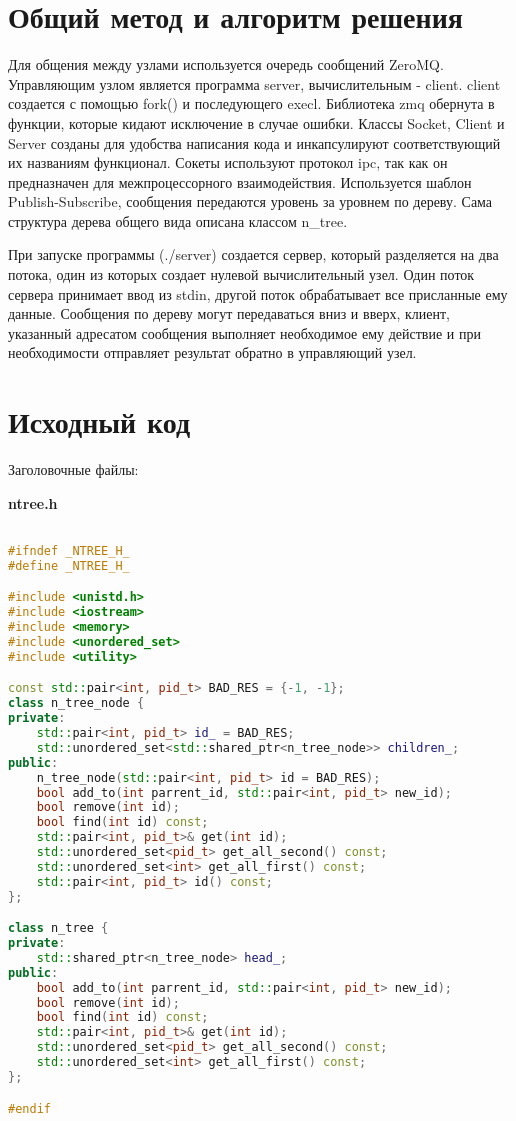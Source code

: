 \section{Общий метод и алгоритм решения}

Для общения между узлами используется очередь сообщений ZeroMQ. Управляющим узлом является программа server, вычислительным - client. client создается с помощью fork() и последующего execl. Библиотека zmq обернута в функции, которые кидают исключение в случае ошибки. Классы Socket, Client и Server созданы для удобства написания кода и инкапсулируют соответствующий их названиям функционал. Сокеты используют протокол ipc, так как он предназначен для межпроцессорного взаимодействия. Используется шаблон Publish-Subscribe, сообщения передаются уровень за уровнем по дереву. Сама структура дерева общего вида описана классом n\_tree.

При запуске программы (./server) создается сервер, который разделяется на два потока, один из которых создает нулевой вычислительный узел. Один поток сервера принимает ввод из stdin, другой поток обрабатывает все присланные ему данные. Сообщения по дереву могут передаваться вниз и вверх, клиент, указанный адресатом сообщения выполняет необходимое ему действие и при необходимости отправляет результат обратно в управляющий узел.

\pagebreak

\section{Исходный код}

Заголовочные файлы:

\textbf{ntree.h}

\begin{lstlisting}[language=C++]

#ifndef _NTREE_H_
#define _NTREE_H_

#include <unistd.h>
#include <iostream>
#include <memory>
#include <unordered_set>
#include <utility>

const std::pair<int, pid_t> BAD_RES = {-1, -1};
class n_tree_node {
private:
    std::pair<int, pid_t> id_ = BAD_RES;
    std::unordered_set<std::shared_ptr<n_tree_node>> children_;
public:
    n_tree_node(std::pair<int, pid_t> id = BAD_RES);
    bool add_to(int parrent_id, std::pair<int, pid_t> new_id);
    bool remove(int id);
    bool find(int id) const;
    std::pair<int, pid_t>& get(int id);
    std::unordered_set<pid_t> get_all_second() const;
    std::unordered_set<int> get_all_first() const;
    std::pair<int, pid_t> id() const;
};

class n_tree {
private:
    std::shared_ptr<n_tree_node> head_;
public:
    bool add_to(int parrent_id, std::pair<int, pid_t> new_id);
    bool remove(int id);
    bool find(int id) const;
    std::pair<int, pid_t>& get(int id);
    std::unordered_set<pid_t> get_all_second() const;
    std::unordered_set<int> get_all_first() const;
};

#endif

\end{lstlisting}

